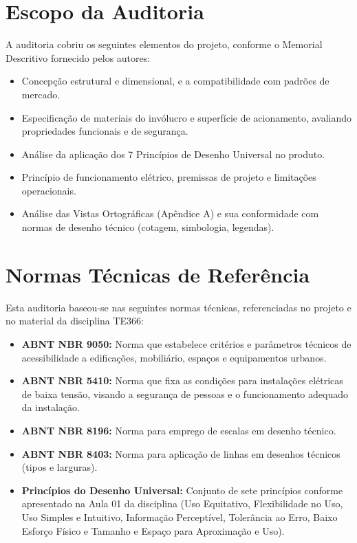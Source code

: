 \documentclass[12pt, openright, a4paper, openany, oneside, chapter=TITLE, section=TITLE, subsection=TITLE, subsubsection=TITLE, subsubsubsection=TITLE, subsubsubsection=TITLE, brazil]{abntex2}
\begin{document}
\chapter{Escopo da Auditoria}
\label{sec:escopo}

A auditoria cobriu os seguintes elementos do projeto, conforme o Memorial Descritivo fornecido pelos autores:

\begin{itemize}
    \item Concepção estrutural e dimensional, e a compatibilidade com padrões de mercado.
    \item Especificação de materiais do invólucro e superfície de acionamento, avaliando propriedades funcionais e de segurança.
    \item Análise da aplicação dos 7 Princípios de Desenho Universal no produto.
    \item Princípio de funcionamento elétrico, premissas de projeto e limitações operacionais.
    \item Análise das Vistas Ortográficas (Apêndice A) e sua conformidade com normas de desenho técnico (cotagem, simbologia, legendas).
\end{itemize}


\chapter{Normas Técnicas de Referência}
\label{sec:normas}

Esta auditoria baseou-se nas seguintes normas técnicas, referenciadas no projeto e no material da disciplina TE366:

\begin{itemize}
    \item \textbf{ABNT NBR 9050:} Norma que estabelece critérios e parâmetros técnicos de acessibilidade a edificações, mobiliário, espaços e equipamentos urbanos.
    \item \textbf{ABNT NBR 5410:} Norma que fixa as condições para instalações elétricas de baixa tensão, visando a segurança de pessoas e o funcionamento adequado da instalação.
    \item \textbf{ABNT NBR 8196:} Norma para emprego de escalas em desenho técnico.
    \item \textbf{ABNT NBR 8403:} Norma para aplicação de linhas em desenhos técnicos (tipos e larguras).
    \item \textbf{Princípios do Desenho Universal:} Conjunto de sete princípios conforme apresentado na Aula 01 da disciplina (Uso Equitativo, Flexibilidade no Uso, Uso Simples e Intuitivo, Informação Perceptível, Tolerância ao Erro, Baixo Esforço Físico e Tamanho e Espaço para Aproximação e Uso).
\end{itemize}
\end{document}
